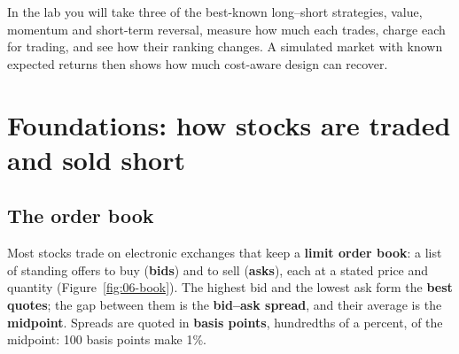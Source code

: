 In the lab you will take three of the best-known long--short strategies, value, momentum and short-term reversal, measure how much each trades, charge each for trading, and see how their ranking changes. A simulated market with known expected returns then shows how much cost-aware design can recover.

\section{Foundations: how stocks are traded and sold short}
\label{sec:06-foundations}

\subsection{The order book}

Most stocks trade on electronic exchanges that keep a \textbf{limit order book}: a list of standing offers to buy (\textbf{bids}) and to sell (\textbf{asks}), each at a stated price and quantity (Figure~\ref{fig:06-book}). The highest bid and the lowest ask form the \textbf{best quotes}; the gap between them is the \textbf{bid--ask spread}, and their average is the \textbf{midpoint}. Spreads are quoted in \textbf{basis points}, hundredths of a percent, of the midpoint: 100 basis points make 1\%.


